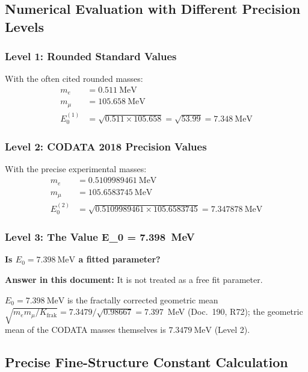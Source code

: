 	\subsection{Numerical Evaluation with Different Precision Levels}
	
	\subsubsection{Level 1: Rounded Standard Values}
	With the often cited rounded masses:
	\begin{align}
		m_e &= \SI{0.511}{\MeV} \\
		m_\mu &= \SI{105.658}{\MeV} \\
		E_0^{(1)} &= \sqrt{0.511 \times 105.658} = \sqrt{53.99} = \SI{7.348}{\MeV}
	\end{align}
	
	\subsubsection{Level 2: CODATA 2018 Precision Values}
	With the precise experimental masses:
	\begin{align}
		m_e &= \SI{0.5109989461}{\MeV} \\
		m_\mu &= \SI{105.6583745}{\MeV} \\
		E_0^{(2)} &= \sqrt{0.5109989461 \times 105.6583745} = \SI{7.347878}{\MeV}
	\end{align}
	
	\subsubsection{Level 3: The Value E\_0 = \SI{7.398}{\MeV}}
	
	\begin{tcolorbox}[colback=yellow!10!white,colframe=orange!75!black,title=Critical Question]
		\textbf{Is $E_0 = \SI{7.398}{\MeV}$ a fitted parameter?}
		
		\textbf{Answer in this document:} It is not treated as a free fit parameter.
		
		$E_0 = \SI{7.398}{\MeV}$ is the fractally corrected geometric mean $\sqrt{m_e m_\mu/K_{\text{frak}}} = 7.3479/\sqrt{0.98667} = 7.397$~MeV (Doc.~190, R72); the geometric mean of the CODATA masses themselves is $\SI{7.3479}{\MeV}$ (Level 2).
	\end{tcolorbox}
	
	\subsection{Precise Fine-Structure Constant Calculation}
	
